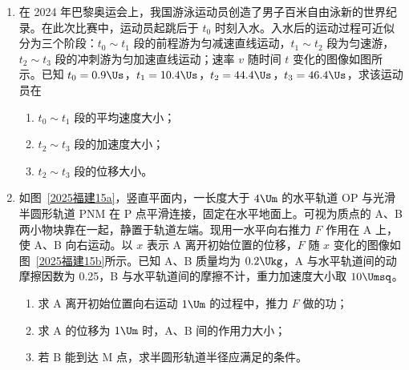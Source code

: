 \documentclass[\gkver]{gaokaozhenti}
\begin{document}
\begin{enumerate}
\item
在 2024 年巴黎奥运会上，我国游泳运动员创造了男子百米自由泳新的世界纪录。在此次比赛中，运动员起跳后于 $t_{0}$ 时刻入水。入水后的运动过程可近似分为三个阶段：$t_{0} \sim t_{1}$ 段的前程游为匀减速直线运动，$t_{1} \sim t_{2}$ 段为匀速游，$t_{2} \sim t_{3}$ 段的冲刺游为匀加速直线运动；速率 $v$ 随时间 $t$ 变化的图像如图所示。已知 $t_{0} = 0.9 \Us$，$t_{1} = 10.4 \Us$，$t_{2} = 44.4 \Us$，$t_{3} = 46.4 \Us$，求该运动员在
\begin{enumerate}
	\item
	$t_{0} \sim t_{1}$ 段的平均速度大小；
	\item
	$t_{2} \sim t_{3}$ 段的加速度大小；
	\item
	$t_{2} \sim t_{3}$ 段的位移大小。
\end{enumerate}

\onepicture[w=6.5cm, align=right]{}

\jdanswer{
\begin{enumerate}
	\item
	$2.4 \Ums$
	\item
	$0.1 \Umsq$
	\item
	$4.2 \Um$
\end{enumerate}
}

\item
如图~\ref{2025福建15a}，竖直平面内，一长度大于 $4 \Um$ 的水平轨道 OP 与光滑半圆形轨道 PNM 在 P 点平滑连接，固定在水平地面上。可视为质点的 A、B 两小物块靠在一起，静置于轨道左端。现用一水平向右推力 $F$ 作用在 A 上，使 A、B 向右运动。以 $x$ 表示 A 离开初始位置的位移，$F$ 随 $x$ 变化的图像如图~\ref{2025福建15b}所示。已知 A、B 质量均为 $0.2 \Ukg$，A 与水平轨道间的动摩擦因数为 0.25，B 与水平轨道间的摩擦不计，重力加速度大小取 $10 \Umsq$。
\begin{enumerate}
	\item
	求 A 离开初始位置向右运动 $1 \Um$ 的过程中，推力 $F$ 做的功；
	\item
	求 A 的位移为 $1 \Um$ 时，A、B 间的作用力大小；
	\item
	若 B 能到达 M 点，求半圆形轨道半径应满足的条件。
\end{enumerate}


\end{enumerate}
\end{document}
